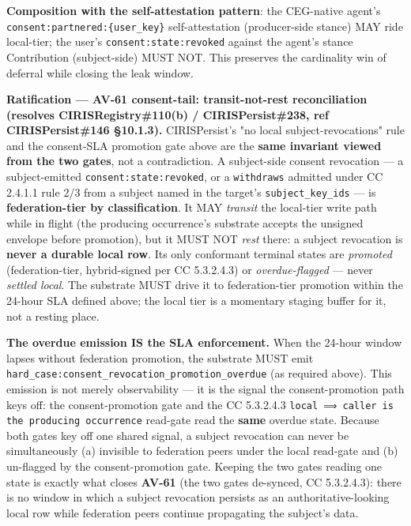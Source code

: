 \documentclass[11pt]{article}
\begin{document}
\textbf{Composition with the self-attestation pattern}: the CEG-native agent's \texttt{consent:partnered:\{user\_key\}} self-attestation (producer-side stance) MAY ride local-tier; the user's \texttt{consent:state:revoked} against the agent's stance Contribution (subject-side) MUST NOT. This preserves the cardinality win of deferral while closing the leak window.


\textbf{Ratification — AV-61 consent-tail: transit-not-rest reconciliation (resolves CIRISRegistry\#110(b) / CIRISPersist\#238, ref CIRISPersist\#146 §10.1.3).} CIRISPersist's "no local subject-revocations" rule and the consent-SLA promotion gate above are the \textbf{same invariant viewed from the two gates}, not a contradiction. A subject-side consent revocation — a subject-emitted \texttt{consent:state:revoked}, or a \texttt{withdraws} admitted under CC 2.4.1.1 rule 2/3 from a subject named in the target's \texttt{subject\_key\_ids} — is \textbf{federation-tier by classification}. It MAY \textit{transit} the local-tier write path while in flight (the producing occurrence's substrate accepts the unsigned envelope before promotion), but it MUST NOT \textit{rest} there: a subject revocation is \textbf{never a durable local row}. Its only conformant terminal states are \textit{promoted} (federation-tier, hybrid-signed per CC 5.3.2.4.3) or \textit{overdue-flagged} — never \textit{settled local}. The substrate MUST drive it to federation-tier promotion within the 24-hour SLA defined above; the local tier is a momentary staging buffer for it, not a resting place.


\textbf{The overdue emission IS the SLA enforcement.} When the 24-hour window lapses without federation promotion, the substrate MUST emit \texttt{hard\_case:consent\_revocation\_promotion\_overdue} (as required above). This emission is not merely observability — it is the signal the consent-promotion path keys off: the consent-promotion gate and the CC 5.3.2.4.3 \texttt{local ⟹ caller is the producing occurrence} read-gate read the \textbf{same} overdue state. Because both gates key off one shared signal, a subject revocation can never be simultaneously (a) invisible to federation peers under the local read-gate and (b) un-flagged by the consent-promotion gate. Keeping the two gates reading one state is exactly what closes \textbf{AV-61} (the two gates de-synced, CC 5.3.2.4.3): there is no window in which a subject revocation persists as an authoritative-looking local row while federation peers continue propagating the subject's data.
\end{document}
